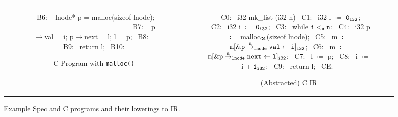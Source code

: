 \begin{figure}[t]
\begin{tabular}{cc}
\begin{subfigure}[b]{0.59\textwidth}
\begin{center}
\begin{allLangEnvScript}
{{~{\tiny \textcolor{mygray}{B6: }}~     lnode* p = malloc(sizeof lnode);                      $\phantom{m \coloneqq \mathrm{\tt m[\&\structPointer{\tt p}{m}{\tt lnode}{val} \leftarrow l]_{i32}};}$
~{\tiny \textcolor{mygray}{B7: }}~     p$\rightarrow$val = i; p$\rightarrow$next = l; l = p;
~{\tiny \textcolor{mygray}{B8: }}~   }
~{\tiny \textcolor{mygray}{B9:}}~   return l;
~{\tiny \textcolor{mygray}{B10:}}~ }
\end{allLangEnvScript}
\end{center}
\caption{\label{fig:llAllocC}C Program with {\tt malloc()}}
\end{subfigure}%
&
\begin{subfigure}[b]{0.41\textwidth}
\begin{center}
\begin{allLangEnvScript}
~{\tiny \textcolor{mygray}{C0:}}~ i32 mk_list (i32 n) {
~{\tiny \textcolor{mygray}{C1:}}~   i32 l $\coloneqq$ ${\tt 0_{i32}}$;
~{\tiny \textcolor{mygray}{C2:}}~   i32 i $\coloneqq$ ${\tt 0_{i32}}$;
~{\tiny \textcolor{mygray}{C3:}}~   while ${\tt i <_{u} n}$:
~{\tiny \textcolor{mygray}{C4:}}~     i32 p $\coloneqq$ malloc$_{\tt C4}$(sizeof lnode);
~{\tiny \textcolor{mygray}{C5:}}~     m $\coloneqq$ $\mathrm{\tt m[\&{\tt \tt p} \overset{m}{\rightarrow}_{\tt lnode} {\tt val} \leftarrow i]_{i32}}$;
~{\tiny \textcolor{mygray}{C6:}}~     m $\coloneqq$ $\mathrm{\tt m[\&{\tt \tt p} \overset{m}{\rightarrow}_{\tt lnode} {\tt next} \leftarrow l]_{i32}}$;
~{\tiny \textcolor{mygray}{C7:}}~     l $\coloneqq$ p;
~{\tiny \textcolor{mygray}{C8:}}~     i $\coloneqq$ i + ${\tt 1_{i32}}$;
~{\tiny \textcolor{mygray}{C9:}}~   return l;
~{\tiny \textcolor{mygray}{CE:}}~ }
\end{allLangEnvScript}
\end{center}
\caption{\label{fig:llAllocCIR}(Abstracted) C IR}
\end{subfigure}%
\\
\end{tabular}
\caption{\label{fig:llAllocSpecAndC}Example Spec and C programs and their lowerings to IR.}
\end{figure}
